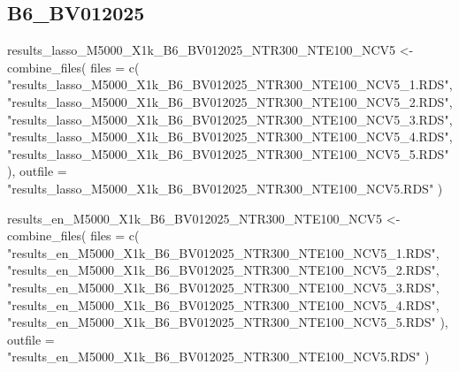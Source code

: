 \documentclass[
]{article}
\newenvironment{Shaded}{\begin{snugshade}}{\end{snugshade}}
\newcommand{\AttributeTok}[1]{\textcolor[rgb]{0.77,0.63,0.00}{#1}}
\newcommand{\FunctionTok}[1]{\textcolor[rgb]{0.00,0.00,0.00}{#1}}
\newcommand{\NormalTok}[1]{#1}
\newcommand{\OtherTok}[1]{\textcolor[rgb]{0.56,0.35,0.01}{#1}}
\newcommand{\StringTok}[1]{\textcolor[rgb]{0.31,0.60,0.02}{#1}}
\begin{document}
\hypertarget{b6_bv012025}{%
\subsection{B6\_BV012025}\label{b6_bv012025}}

\begin{Shaded}
\begin{Highlighting}[]
\NormalTok{results\_lasso\_M5000\_X1k\_B6\_BV012025\_NTR300\_NTE100\_NCV5 }\OtherTok{\textless{}{-}} \FunctionTok{combine\_files}\NormalTok{(}
  \AttributeTok{files =} \FunctionTok{c}\NormalTok{(}
    \StringTok{"results\_lasso\_M5000\_X1k\_B6\_BV012025\_NTR300\_NTE100\_NCV5\_1.RDS"}\NormalTok{,}
    \StringTok{"results\_lasso\_M5000\_X1k\_B6\_BV012025\_NTR300\_NTE100\_NCV5\_2.RDS"}\NormalTok{,}
    \StringTok{"results\_lasso\_M5000\_X1k\_B6\_BV012025\_NTR300\_NTE100\_NCV5\_3.RDS"}\NormalTok{,}
    \StringTok{"results\_lasso\_M5000\_X1k\_B6\_BV012025\_NTR300\_NTE100\_NCV5\_4.RDS"}\NormalTok{,}
    \StringTok{"results\_lasso\_M5000\_X1k\_B6\_BV012025\_NTR300\_NTE100\_NCV5\_5.RDS"}
\NormalTok{  ),}
  \AttributeTok{outfile =} \StringTok{"results\_lasso\_M5000\_X1k\_B6\_BV012025\_NTR300\_NTE100\_NCV5.RDS"}
\NormalTok{)}

\NormalTok{results\_en\_M5000\_X1k\_B6\_BV012025\_NTR300\_NTE100\_NCV5 }\OtherTok{\textless{}{-}} \FunctionTok{combine\_files}\NormalTok{(}
  \AttributeTok{files =} \FunctionTok{c}\NormalTok{(}
    \StringTok{"results\_en\_M5000\_X1k\_B6\_BV012025\_NTR300\_NTE100\_NCV5\_1.RDS"}\NormalTok{,}
    \StringTok{"results\_en\_M5000\_X1k\_B6\_BV012025\_NTR300\_NTE100\_NCV5\_2.RDS"}\NormalTok{,}
    \StringTok{"results\_en\_M5000\_X1k\_B6\_BV012025\_NTR300\_NTE100\_NCV5\_3.RDS"}\NormalTok{,}
    \StringTok{"results\_en\_M5000\_X1k\_B6\_BV012025\_NTR300\_NTE100\_NCV5\_4.RDS"}\NormalTok{,}
    \StringTok{"results\_en\_M5000\_X1k\_B6\_BV012025\_NTR300\_NTE100\_NCV5\_5.RDS"}
\NormalTok{  ),}
  \AttributeTok{outfile =} \StringTok{"results\_en\_M5000\_X1k\_B6\_BV012025\_NTR300\_NTE100\_NCV5.RDS"}
\NormalTok{)}


\end{Highlighting}
\end{Shaded}
\end{document}

